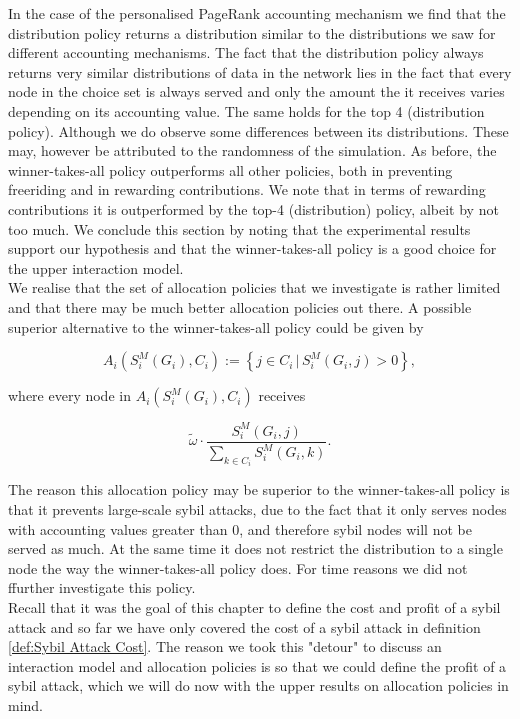 \noindent{}In the case of the personalised PageRank accounting mechanism we find that the distribution policy returns a distribution similar to the distributions we saw for different accounting mechanisms. The fact that the distribution policy always returns very similar distributions of data in the network lies in the fact that every node in the choice set is always served and only the amount the it receives varies depending on its accounting value. The same holds for the top 4 (distribution policy). Although we do observe some differences between its distributions. These may, however be attributed to the randomness of the simulation. As before, the winner-takes-all policy outperforms all other policies, both in preventing freeriding and in rewarding contributions. We note that in terms of rewarding contributions it is outperformed by the top-4 (distribution) policy, albeit by not too much. We conclude this section by noting that the experimental results support our hypothesis and that the winner-takes-all policy is a good choice for the upper interaction model.\vspace{1em}\\

\noindent{}We realise that the set of allocation policies that we investigate is rather limited and that there may be much better allocation policies out there. A possible superior alternative to the winner-takes-all policy could be given by 

\[
A_i(S_i^M(G_i),C_i):=\left\lbrace{} j\in{}C_i\,|\,S^M_i(G_i,j) > 0 \right\rbrace ,
\]

\noindent{}where every node in $A_i(S_i^M(G_i),C_i)$ receives

\[
\tilde{\omega}\cdot\frac{S^M_i(G_i,j)}{\sum\limits_{k\in{}C_i}S^M_i(G_i,k)}.
\]

\noindent{}The reason this allocation policy may be superior to the winner-takes-all policy is that it prevents large-scale sybil attacks, due to the fact that it only serves nodes with accounting values greater than $0$, and therefore sybil nodes will not be served as much. At the same time it does not restrict the distribution to a single node the way the winner-takes-all policy does. For time reasons we did not ffurther investigate this policy. \vspace{1em}\\

\noindent{}Recall that it was the goal of this chapter to define the cost and profit of a sybil attack and so far we have only covered the cost of a sybil attack in definition \ref{def:Sybil Attack Cost}. The reason we took this "detour" to discuss an interaction model and allocation policies is so that we could define the profit of a sybil attack, which we will do now with the upper results on allocation policies in mind.\vspace{1em}\\

